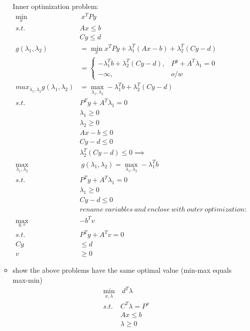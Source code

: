 \documentclass[12pt,letter]{article}
\begin{document}
\begin{enumerate}
\begin{itemize}
    Inner optimization problem:
    \begin{align*}
      \min_x &\ x^TPy\\
      s.t.\ &Ax \leq b\\
             &Cy \leq d
      \\
      g(\lambda_1,\lambda_2) & = \min_x x^TPy + \lambda_1^T(Ax-b) + \lambda_2^T(Cy-d)\\
      & =
        \begin{cases}
          -\lambda_1^Tb + \lambda_2^T(Cy-d), & P^y + A^T\lambda_1 = 0\\
          - \infty, & o/w
        \end{cases}\\
      max_{\lambda_1,\lambda_2} g(\lambda_1,\lambda_2) & = \max_{\lambda_1,\lambda_2} -\lambda_1^Tb + \lambda_2^T(Cy-d)\\
      s.t.\ & P^Ty + A^T\lambda_1 = 0\\
      &\lambda_1 \geq 0\\
      &\lambda_2 \geq 0\\
      &Ax-b \leq 0\\
      &Cy-d \leq 0\\
      &\lambda_2^T(Cy-d)  \leq 0 \implies\\
      \max_{\lambda_1,\lambda_2} & \ g(\lambda_1,\lambda_2) = \max_{\lambda_1,\lambda_2} -\lambda_1^Tb\\
      s.t.\ & P^Ty + A^T\lambda_1 = 0\\
      &\lambda_1 \geq 0\\
             &Cy-d \leq 0\\
             &rename\ variables\ and\ enclose\ with\ outer\ optimization:\\
      \max_{y,v} &-b^Tv\\
      s.t.\ &P^T y + A^Tv = 0\\
      Cy &\leq d\\
      v &\geq 0
    \end{align*}
  \item show the above problems have the same optimal value (min-max equals max-min)
    \begin{align*}
      \min_{x,\lambda}&\ d^T \lambda\\
      s.t.\ & C^T\lambda = P^x\\
                       &Ax \leq b\\
                       &\lambda \geq 0\\
      \\

\end{align*}
\end{itemize}
\end{enumerate}
\end{document}
